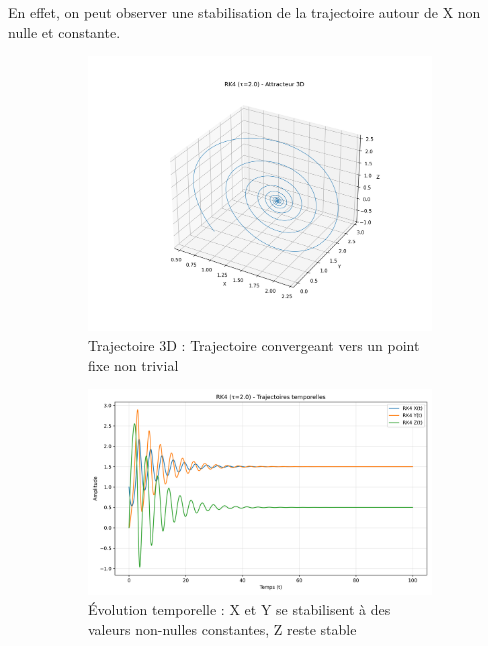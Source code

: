 En effet, on peut observer une stabilisation de la trajectoire autour de X non nulle et constante. 
\begin{figure}[H]
    \centering
    \begin{subfigure}[b]{0.5\textwidth}
        \includegraphics[width=\textwidth]{figures/rk4/rk4_tau2.0_3d}
        \caption{Trajectoire 3D : Trajectoire convergeant vers un point fixe non trivial}
    \end{subfigure}
    \begin{subfigure}[b]{0.4\textwidth}
        \includegraphics[width=\textwidth]{figures/rk4/rk4_tau2.0_time}
        \caption{Évolution temporelle : X et Y se stabilisent à des valeurs non-nulles constantes, Z reste stable}
    \end{subfigure}
    \begin{subfigure}[b]{0.3\textwidth}

\end{subfigure}
\end{figure}
